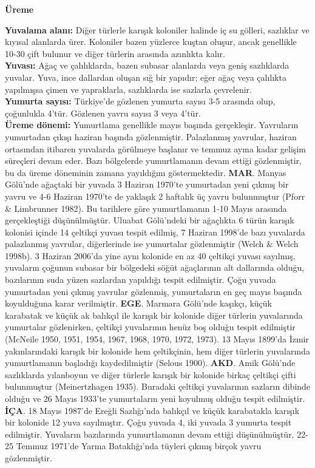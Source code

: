 \documentclass[
  letterpaper,
  DIV=11,
  numbers=noendperiod]{scrreprt}
\begin{document}
\textbf{Üreme}

\textbf{Yuvalama alanı:} Diğer türlerle karışık koloniler halinde iç su
gölleri, sazlıklar ve kıyısal alanlarda ürer. Koloniler bazen yüzlerce
kuştan oluşur, ancak genellikle 10-30 çift bulunur ve diğer türlerin
arasında azınlıkta kalır.\\
\textbf{Yuvası:} Ağaç ve çalılıklarda, bazen subasar alanlarda veya
geniş sazlıklarda yuvalar. Yuva, ince dallardan oluşan sığ bir yapıdır;
eğer ağaç veya çalılıkta yapılmışsa çimen ve yapraklarla, sazlıklarda
ise sazlarla çevrelenir.\\
\textbf{Yumurta sayısı:} Türkiye'de gözlenen yumurta sayısı 3-5 arasında
olup, çoğunlukla 4'tür. Gözlenen yavru sayısı 3 veya 4'tür.\\
\textbf{Üreme dönemi:} Yumurtlama genellikle mayıs başında gerçekleşir.
Yavruların yumurtadan çıkışı haziran başında gözlenmiştir. Palazlanmış
yavrular, haziran ortasından itibaren yuvalarda görülmeye başlanır ve
temmuz ayına kadar gelişim süreçleri devam eder. Bazı bölgelerde
yumurtlamanın devam ettiği gözlenmiştir, bu da üreme döneminin zamana
yayıldığını göstermektedir. \textbf{MAR}. Manyas Gölü'nde ağaçtaki bir
yuvada 3 Haziran 1970'te yumurtadan yeni çıkmış bir yavru ve 4-6 Haziran
1970'te de yaklaşık 2 haftalık üç yavru bulunmuştur (Pforr \& Limbrunner
1982). Bu tarihlere göre yumurtlamanın 1-10 Mayıs arasında gerçekleştiği
düşünülmüştür. Uluabat Gölü'ndeki bir ağaçlıkta 6 türün karışık kolonisi
içinde 14 çeltikçi yuvası tespit edilmiş, 7 Haziran 1998'de bazı
yuvalarda palazlanmış yavrular, diğerlerinde ise yumurtalar gözlenmiştir
(Welch \& Welch 1998b). 3 Haziran 2006'da yine aynı kolonide en az 40
çeltikçi yuvası sayılmış, yuvaların çoğunun subasar bir bölgedeki söğüt
ağaçlarının alt dallarında olduğu, bazılarının suda yüzen sazlardan
yapıldığı tespit edilmiştir. Çoğu yuvada yumurtadan yeni çıkmış yavrular
gözlenmiş, yumurtaların en geç mayıs başında koyulduğuna karar
verilmiştir. \textbf{EGE}. Marmara Gölü'nde kaşıkçı, küçük karabatak ve
küçük ak balıkçıl ile karışık bir kolonide diğer türlerin yuvalarında
yumurtalar gözlenirken, çeltikçi yuvalarının henüz boş olduğu tespit
edilmiştir (McNeile 1950, 1951, 1954, 1967, 1968, 1970, 1972, 1973). 13
Mayıs 1899'da İzmir yakınlarındaki karışık bir kolonide hem çeltikçinin,
hem diğer türlerin yuvalarında yumurtlamanın başladığı kaydedilmiştir
(Selous 1900). \textbf{AKD}. Amik Gölü'nde sazlıklarda yılanboyun ve
diğer türlerle karışık bir kolonide birkaç çeltikçi çifti bulunmuştur
(Meinertzhagen 1935). Buradaki çeltikçi yuvalarının sazların dibinde
olduğu ve 26 Mayıs 1933'te yumurtaların yeni koyulmuş olduğu tespit
edilmiştir. \textbf{İÇA}. 18 Mayıs 1987'de Ereğli Sazlığı'nda balıkçıl
ve küçük karabatakla karışık bir kolonide 12 yuva sayılmıştır. Çoğu
yuvada 4, iki yuvada 3 yumurta tespit edilmiştir. Yuvaların bazılarında
yumurtlamanın devam ettiği düşünülmüştür. 22-25 Temmuz 1971'de Yarma
Bataklığı'nda tüyleri çıkmış birçok yavru gözlenmiştir.
\end{document}
